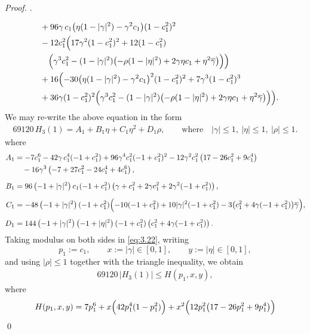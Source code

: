 \documentclass[a4paper,12pt,reqno]{amsart} %
\numberwithin{equation}{section}
\theoremstyle{definition}
\newenvironment{pf}[1][]{%
	\vskip 3mm
	\noindent
	\ifthenelse{\equal{#1}{}}%
	{{\slshape Proof. }}%
	{{\slshape #1.} }%
}%
{\qed\bigskip}
\begin{document}
\begin{pf}
\begin{align}
&
\quad+96\gamma\,c_{1}\bigl(\eta(1-|\gamma|^{2})-\gamma^{2}c_{1}\bigr)(1-c_{1}^{2})^{2} \notag\\
&\quad
-12c_{1}^{2}\Bigl(
17\gamma^{2}(1-c_{1}^{2})^{2}
+12(1-c_{1}^{2})\notag\\
&\qquad
\Bigl(\gamma^{3}c_{1}^{2}
-(1-|\gamma|^{2})\bigl(-\rho(1-|\eta|^{2})+2\gamma\eta c_{1}+\eta^{2}\overline{\gamma}\bigr)\Bigr)
\Bigr) \notag\\
&\quad
+16\Bigl(
-30\bigl(\eta(1-|\gamma|^{2})-\gamma^{2}c_{1}\bigr)^{2}(1-c_{1}^{2})^{2}
+7\gamma^{3}(1-c_{1}^{2})^{3} \notag\\
&\quad
+36\gamma(1-c_{1}^{2})^{2}\Bigl(\gamma^{3}c_{1}^{2}
-(1-|\gamma|^{2})\bigl(-\rho(1-|\eta|^{2})+2\gamma\eta c_{1}+\eta^{2}\overline{\gamma}\bigr)\Bigr)
\Bigr).
\end{align}
We may re-write the above equation in the form
\begin{align}\label{eq:3.22}
69120\,  H_3(1)=A_{1}+B_{1} \eta+C_{1} \eta^2+D_{1} \rho,
\qquad  \mbox{where} \quad |\gamma|\le 1,\ |\eta|\le 1,\ |\rho|\le 1.
\end{align}
where
\begin{align*}
A_{1}&=-7c_{1}^{6}-42\gamma\,c_{1}^{4}(-1+c_{1}^{2})
+96\gamma^{4}c_{1}^{2}(-1+c_{1}^{2})^{2}
-12\gamma^{2}c_{1}^{2}\left(17-26c_{1}^{2}+9c_{1}^{4}\right)\\
&\quad-16\gamma^{3}\left(-7+27c_{1}^{2}-24c_{1}^{4}+4c_{1}^{6}\right),\\[2mm]
B_{1}&=96\left(-1+|\gamma|^{2}\right)c_{1}(-1+c_{1}^{2})
\left(\gamma+c_{1}^{2}+2\gamma c_{1}^{2}+2\gamma^{2}(-1+c_{1}^{2})\right),\\[2mm]
C_{1}&=-48\left(-1+|\gamma|^{2}\right)(-1+c_{1}^{2})
\Bigl(-10(-1+c_{1}^{2})+10|\gamma|^{2}(-1+c_{1}^{2})
-3\bigl(c_{1}^{2}+4\gamma(-1+c_{1}^{2})\bigr)\overline{\gamma}\Bigr),\\[2mm]
D_{1}&=144\left(-1+|\gamma|^{2}\right)\left(-1+|\eta|^{2}\right)(-1+c_{1}^{2})
\left(c_{1}^{2}+4\gamma(-1+c_{1}^{2})\right).
\end{align*}
Taking modulus on both sides in \eqref{eq:3.22}, writing
\[
p_1:=c_1,\qquad x:=|\gamma|\in[0,1],\qquad y:=|\eta|\in[0,1],
\]
and using $|\rho|\le 1$ together with the triangle inequality, we obtain
\begin{align*}
69120\, |H_{3}(1)| \leq H(p_1, x, y),
\end{align*}
where
\begin{align}\label{eq:3.23}
H(p_1,x,y)
&= 7p_1^{6}
+ x\Bigl(42p_1^{4}(1-p_1^{2})\Bigr)
+ x^{2}\Bigl(12p_1^{2}\bigl(17-26p_1^{2}+9p_1^{4}\bigr)\Bigr)\notag\\

\end{align}
\end{pf}
\end{document}
